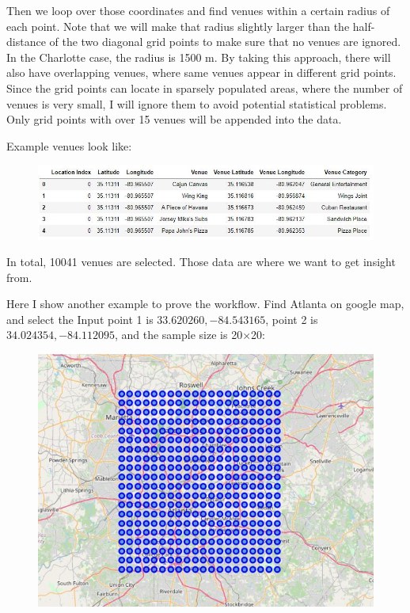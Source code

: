 \documentclass{article}
\begin{document}
Then we loop over those coordinates and find venues within a certain radius of each point. Note that we will make that radius slightly larger than the half-distance of the two diagonal grid points to make sure that no venues are ignored.
In the Charlotte case, the radius is 1500 m.
By taking this approach, there will also have overlapping venues, where same venues appear in different grid points.
Since the grid points can locate in sparsely populated areas, where the number of venues is very small, I will ignore them to avoid potential statistical problems. Only grid points with over 15 venues will be appended into the data.

Example venues look like:
\begin{figure}[h!]
\includegraphics[width=1.0\textwidth]{c4.jpg}
\centering
\end{figure}

In total, 10041 venues are selected. Those data are where we want to get insight from.

Here I show another example to prove the workflow.
Find Atlanta on google map, and select the 
Input point 1 is $33.620260, -84.543165$, point 2 is $34.024354, -84.112095$, and the sample size is 20$\times$20:
\begin{figure}[h!]
\includegraphics[width=1.0\textwidth]{c5.jpg}
\centering
\end{figure}
\end{document}
